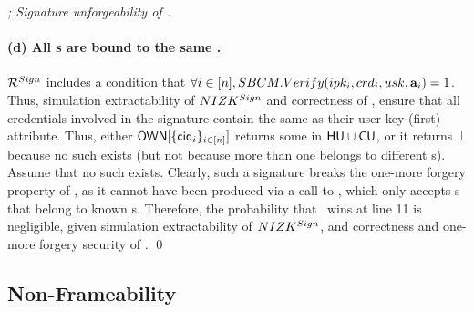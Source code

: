 \begin{proof}[; Signature unforgeability of \CUASGen]
  \paragraph{(d) All {\cred}s are bound to the same \usk.} %
  $\mathcal{R}^{Sign}$ includes a condition that $\forall i\in[n],
  SBCM.Verify(ipk_i,crd_i,usk,\mathbf{a}_i) = 1$. Thus, simulation
  extractability of $NIZK^{Sign}$ and correctness of \SBCM, ensure that all
  credentials involved in the signature contain the same \usk as their user key
  (first) attribute. Thus, either $\mathsf{OWN}[\lbrace \mathsf{cid}_i \rbrace_{i\in[n]}]$
  returns some \uid in $\mathsf{HU} \cup \mathsf{CU}$, or it returns $\bot$ because no such
  \uid exists (but not because more than one \cid belongs to different {\uid}s).
  Assume that no such \uid exists. Clearly, such a signature breaks the one-more
  forgery property of \SBCM, as it cannot have been produced via a call to
  \SIGN, which only accepts {\cid}s that belong to known {\uid}s. Therefore, the
  probability that \adv~wins at line 11 is negligible, given simulation
  extractability of $NIZK^{Sign}$, and correctness and one-more forgery
  security of \SBCM.
  \qed
\end{proof}

\subsection{Non-Frameability}

